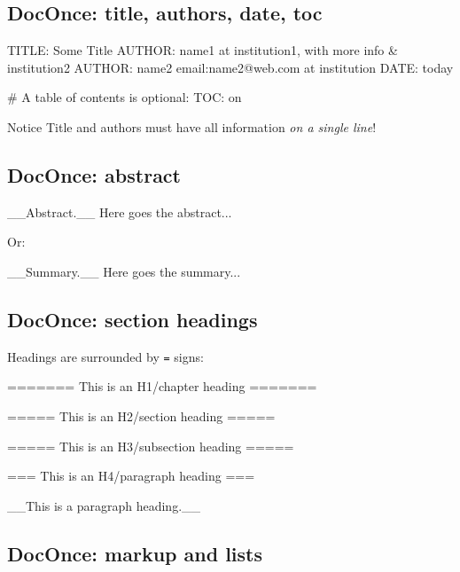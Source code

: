 \documentclass[%
oneside,                 %
final,                   %
10pt]{article}
\begin{document}
\subsection{DocOnce: title, authors, date, toc}









\bccq
TITLE: Some Title
AUTHOR: name1 at institution1, with more info & institution2
AUTHOR: name2 email:name2@web.com at institution
DATE: today

# A table of contents is optional:
TOC: on

\eccq


\begin{block}{Notice}
Title and authors must have all information \emph{on a single line}!
\end{block}

\subsection{DocOnce: abstract}




\bccq
__Abstract.__
Here goes the abstract...

\eccq


Or:



\bccq
__Summary.__
Here goes the summary...

\eccq


\subsection{DocOnce: section headings}

Headings are surrounded by \texttt{=} signs:










\bccq
======= This is an H1/chapter heading =======

===== This is an H2/section heading =====

===== This is an H3/subsection heading =====

=== This is an H4/paragraph heading ===

__This is a paragraph heading.__

\eccq


\subsection{DocOnce: markup and lists}
\end{document}
